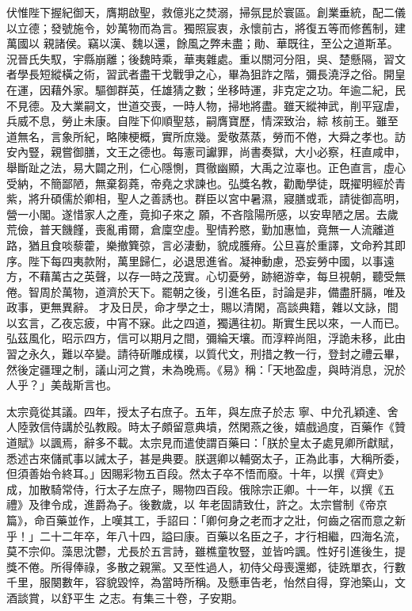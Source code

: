 \begin{pinyinscope}
 伏惟陛下握紀御天，膺期啟聖，救億兆之焚溺，掃氛昆於寰區。創業垂統，配二儀以立德；發號施令，妙萬物而為言。獨照宸衷，永懷前古，將復五等而修舊制，建萬國以
 親諸侯。竊以漢、魏以還，餘風之弊未盡；勛、華既往，至公之道斯革。況晉氏失馭，宇縣崩離；後魏時乘，華夷雜處。重以關河分阻，吳、楚懸隔，習文者學長短縱橫之術，習武者盡干戈戰爭之心，畢為狙詐之階，彌長澆浮之俗。開皇在運，因藉外家。驅御群英，任雄猜之數；坐移時運，非克定之功。年逾二紀，民不見德。及大業嗣文，世道交喪，一時人物，掃地將盡。雖天縱神武，削平寇虐，兵威不息，勞止未康。自陛下仰順聖慈，嗣膺寶歷，情深致治，綜
 核前王。雖至道無名，言象所紀，略陳梗概，實所庶幾。愛敬蒸蒸，勞而不倦，大舜之孝也。訪安內豎，親嘗御膳，文王之德也。每憲司讞罪，尚書奏獄，大小必察，枉直咸申，舉斷趾之法，易大闢之刑，仁心隱惻，貫徹幽顯，大禹之泣辜也。正色直言，虛心受納，不簡鄙陋，無棄芻蕘，帝堯之求諫也。弘獎名教，勸勵學徒，既擢明經於青紫，將升碩儒於卿相，聖人之善誘也。群臣以宮中暑濕，寢膳或乖，請徙御高明，營一小閣。遂惜家人之產，竟抑子來之
 願，不吝陰陽所感，以安卑陋之居。去歲荒儉，普天饑饉，喪亂甫爾，倉廩空虛。聖情矜愍，勤加惠恤，竟無一人流離道路，猶且食啖藜藿，樂撤簨弶，言必淒動，貌成臒瘠。公旦喜於重譯，文命矜其即序。陛下每四夷款附，萬里歸仁，必退思進省。凝神動慮，恐妄勞中國，以事遠方，不藉萬古之英聲，以存一時之茂實。心切憂勞，跡絕游幸，每旦視朝，聽受無倦。智周於萬物，道濟於天下。罷朝之後，引進名臣，討論是非，備盡肝膈，唯及政事，更無異辭。
 才及日昃，命才學之士，賜以清閑，高談典籍，雜以文詠，間以玄言，乙夜忘疲，中宵不寐。此之四道，獨邁往初。斯實生民以來，一人而已。弘茲風化，昭示四方，信可以期月之間，彌綸天壤。而淳粹尚阻，浮詭未移，此由習之永久，難以卒變。請待斫雕成樸，以質代文，刑措之教一行，登封之禮云畢，然後定疆理之制，議山河之賞，未為晚焉。《易》稱：「天地盈虛，與時消息，況於人乎？」美哉斯言也。



 太宗竟從其議。四年，授太子右庶子。五年，與左庶子於志
 寧、中允孔穎達、舍人陸敦信侍講於弘教殿。時太子頗留意典墳，然閑燕之後，嬉戲過度，百藥作《贊道賦》以諷焉，辭多不載。太宗見而遣使謂百藥曰：「朕於皇太子處見卿所獻賦，悉述古來儲貳事以誡太子，甚是典要。朕選卿以輔弼太子，正為此事，大稱所委，但須善始令終耳。」因賜彩物五百段。然太子卒不悟而廢。十年，以撰《齊史》成，加散騎常侍，行太子左庶子，賜物四百段。俄除宗正卿。十一年，以撰《五禮》及律令成，進爵為子。後數歲，以
 年老固請致仕，許之。太宗嘗制《帝京篇》，命百藥並作，上嘆其工，手詔曰：「卿何身之老而才之壯，何齒之宿而意之新乎！」二十二年卒，年八十四，謚曰康。百藥以名臣之子，才行相繼，四海名流，莫不宗仰。藻思沈鬱，尤長於五言詩，雖樵童牧豎，並皆吟諷。性好引進後生，提獎不倦。所得俸祿，多散之親黨。又至性過人，初侍父母喪還鄉，徒跣單衣，行數千里，服闋數年，容貌毀悴，為當時所稱。及懸車告老，怡然自得，穿池築山，文酒談賞，以舒平生
 之志。有集三十卷，子安期。




\end{pinyinscope}
